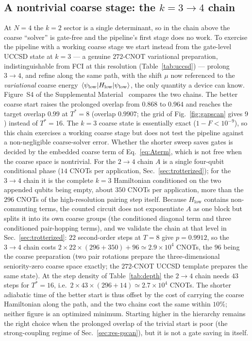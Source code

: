 \documentclass[
  aps,            %
  prc,            %
  reprint,        %
  superscriptaddress,
  floatfix,
  nofootinbib
]{revtex4-2}
\newcommand{\Hlow}{H_{\mathrm{low}}}
\newcommand{\SM}{Supplemental Material~\cite{SM}}
\begin{document}
\subsection{A nontrivial coarse stage: the $k=3\to4$ chain}
\label{sec:res-k34}
At $N=4$ the $k=2$ sector is a single determinant, so in the chain above the
coarse ``solver'' is gate-free and the pipeline's first stage does no work.  To
exercise the pipeline with a working coarse stage we start instead from the
gate-level UCCSD state at $k=3$ --- a genuine $272$-CNOT variational preparation,
indistinguishable from FCI at this resolution (Table~\ref{tab:uccsd}) --- prolong
$3\to4$, and refine along the same path, with the shift $\mu$ now referenced to
the \emph{variational} coarse energy $\expval{\Hlow}{\psi_{\rm low}}$, the only
quantity a device can know.  Figure~S4 of the \SM{} compares the two chains.
The better coarse start raises the prolonged overlap from $0.868$ to $0.964$ and
reaches the target overlap $0.99$ at $T^{*}=8$ (overlap $0.9907$; the grid of
Fig.~\ref{fig:gapscan} gives $9$) instead of $T^{*}=16$.  The $k=3$ coarse
state is essentially exact ($1-F<10^{-9}$), so this chain exercises a working
coarse stage but does not test the pipeline against a non-negligible
coarse-solver error.  Whether the shorter sweep saves gates is decided by the
embedded coarse term of Eq.~\eqref{eq:Aterm}, which is not free when the
coarse space is nontrivial.  For the $2\to4$ chain $A$ is a single four-qubit
conditional phase ($14$ CNOTs per application, Sec.~\ref{sec:trotterized});
for the $3\to4$ chain it is the complete $k=3$ Hamiltonian conditioned on the
two appended qubits being empty, about $350$ CNOTs per application, more than
the $296$ CNOTs of the high-resolution pairing step itself.  Because
$\Hlow$ contains non-commuting terms, the counted circuit does not
exponentiate $A$ as one block but splits it into its own coarse groups (the
conditioned diagonal term and three conditioned pair-hopping terms), and we
validate the chain at that level in Sec.~\ref{sec:trotterized}: $22$
second-order steps at $T=8$ give $p=0.9912$, so the $3\to4$ chain costs
$2\times22\times(296+350)+96\simeq2.9\times10^{4}$ CNOTs, the $96$ being the
coarse preparation (two pair rotations prepare the three-dimensional
seniority-zero coarse space exactly; the $272$-CNOT UCCSD template prepares
the same state).  At the step density of Table~\ref{tab:depth} the $2\to4$
chain needs $43$ steps for $T^{*}=16$, i.e.\
$2\times43\times(296+14)\simeq2.7\times10^{4}$ CNOTs.  The shorter adiabatic
time of the better start is thus offset by the cost of carrying the coarse
Hamiltonian along the path, and the two chains cost the same within $10\%$;
neither figure is an optimized minimum.  Starting higher in the hierarchy
remains the right choice when the prolonged overlap of the trivial start is
poor (the strong-coupling regime of Sec.~\ref{sec:res-gscan}), but it is not
a gate saving in itself.
\end{document}
